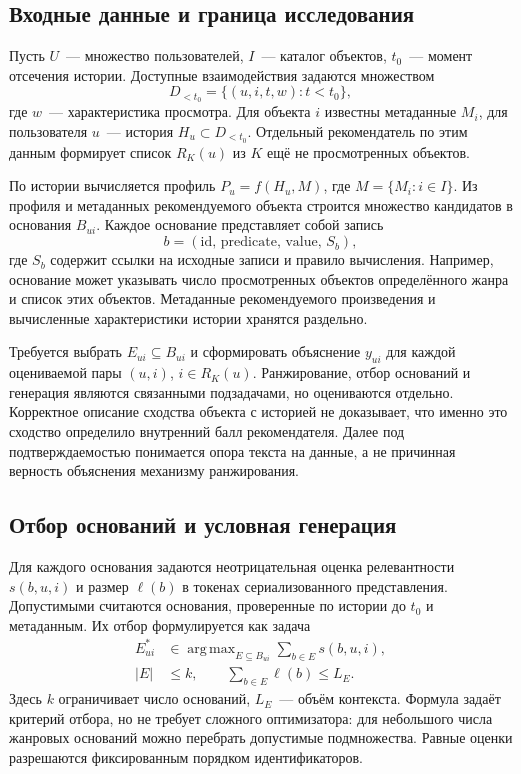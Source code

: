 \documentclass{misisarticle}
\begin{document}
\subsection{Входные данные и граница исследования}

Пусть $U$~--- множество пользователей, $I$~--- каталог объектов, $t_0$~--- момент отсечения истории. Доступные взаимодействия задаются множеством
\begin{equation}
 D_{<t_0}=\{(u,i,t,w):t<t_0\},
 \label{eq:history}
\end{equation}
где $w$~--- характеристика просмотра. Для объекта $i$ известны метаданные $M_i$, для пользователя $u$~--- история $H_u\subset D_{<t_0}$. Отдельный рекомендатель по этим данным формирует список $R_K(u)$ из $K$ ещё не просмотренных объектов.

По истории вычисляется профиль $P_u=f(H_u,M)$, где $M=\{M_i:i\in I\}$. Из профиля и метаданных рекомендуемого объекта строится множество кандидатов в основания $B_{ui}$. Каждое основание представляет собой запись
\begin{equation}
 b=(\mathrm{id},\,\mathrm{predicate},\,\mathrm{value},\,S_b),
 \label{eq:evidence}
\end{equation}
где $S_b$ содержит ссылки на исходные записи и правило вычисления. Например, основание может указывать число просмотренных объектов определённого жанра и список этих объектов. Метаданные рекомендуемого произведения и вычисленные характеристики истории хранятся раздельно.

Требуется выбрать $E_{ui}\subseteq B_{ui}$ и сформировать объяснение $y_{ui}$ для каждой оцениваемой пары $(u,i)$, $i\in R_K(u)$. Ранжирование, отбор оснований и генерация являются связанными подзадачами, но оцениваются отдельно. Корректное описание сходства объекта с историей не доказывает, что именно это сходство определило внутренний балл рекомендателя. Далее под подтверждаемостью понимается опора текста на данные, а не причинная верность объяснения механизму ранжирования.

\subsection{Отбор оснований и условная генерация}

Для каждого основания задаются неотрицательная оценка релевантности $s(b,u,i)$ и размер $\ell(b)$ в токенах сериализованного представления. Допустимыми считаются основания, проверенные по истории до $t_0$ и метаданным. Их отбор формулируется как задача
\begin{equation}
 \begin{aligned}
 E^*_{ui}&\in\mathop{\mathrm{arg\,max}}_{E\subseteq B_{ui}}
                 \sum_{b\in E}s(b,u,i),\\
 |E|&\leq k,\qquad \sum_{b\in E}\ell(b)\leq L_E .
 \end{aligned}
 \label{eq:selection}
\end{equation}
Здесь $k$ ограничивает число оснований, $L_E$~--- объём контекста. Формула задаёт критерий отбора, но не требует сложного оптимизатора: для небольшого числа жанровых оснований можно перебрать допустимые подмножества. Равные оценки разрешаются фиксированным порядком идентификаторов.
\end{document}

